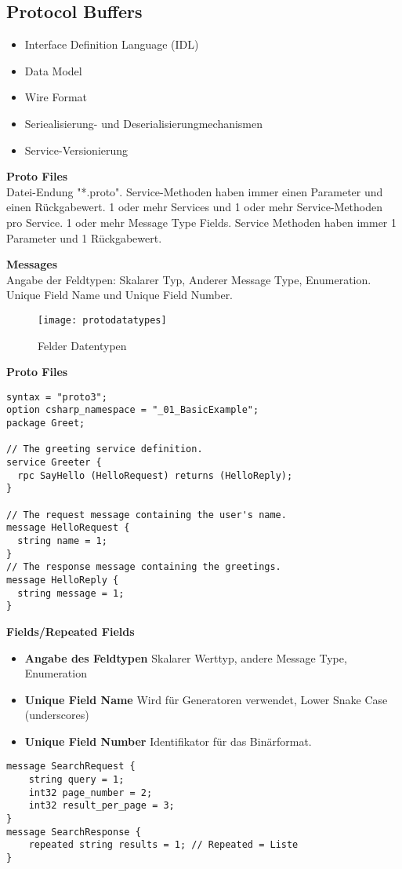 \subsection{Protocol Buffers}
\begin{itemize}
  \itemsep -0.5em 
  \item Interface Definition Language (IDL)
  \item Data Model
  \item Wire Format
  \item Seriealisierung- und Deserialisierungmechanismen
  \item Service-Versionierung
\end{itemize}

\textbf{Proto Files} \\
Datei-Endung "*.proto". Service-Methoden haben immer einen Parameter und einen Rückgabewert. 1 oder mehr Services und 1 oder mehr Service-Methoden pro Service. 1 oder mehr Message Type Fields. Service Methoden haben immer 1 Parameter und 1 Rückgabewert.

\textbf{Messages} \\
Angabe der Feldtypen: Skalarer Typ, Anderer Message Type, Enumeration. Unique Field Name und Unique Field Number.

\begin{figure}[h!]
  \center
  \texttt{[image: protodatatypes]}
  \caption{Felder Datentypen}
\end{figure}

\textbf{Proto Files}
\begin{lstlisting}
syntax = "proto3"; 
option csharp_namespace = "_01_BasicExample"; 
package Greet; 

// The greeting service definition. 
service Greeter {
  rpc SayHello (HelloRequest) returns (HelloReply);
} 

// The request message containing the user's name. 
message HelloRequest {
  string name = 1; 
} 
// The response message containing the greetings. 
message HelloReply {
  string message = 1; 
}
\end{lstlisting}

\textbf{Fields/Repeated Fields} \\
\begin{itemize}
    \item \textbf{Angabe des Feldtypen} Skalarer Werttyp, andere Message Type, Enumeration
    \item \textbf{Unique Field Name} Wird für Generatoren verwendet, Lower Snake Case (underscores)
    \item \textbf{Unique Field Number} Identifikator für das Binärformat.
\end{itemize}
\begin{lstlisting}
message SearchRequest {
	string query = 1;
	int32 page_number = 2;
	int32 result_per_page = 3; 
}
message SearchResponse {
	repeated string results = 1; // Repeated = Liste
}
\end{lstlisting}

